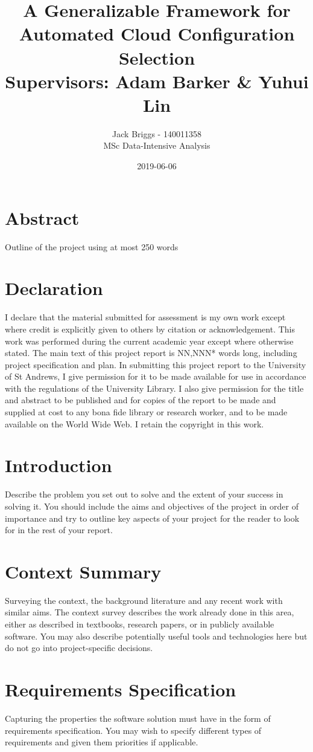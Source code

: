 \documentclass{article}
\title{\vspace{-2.0cm} A Generalizable Framework for Automated Cloud Configuration Selection \\ \vspace{0.5cm} \large Supervisors: Adam Barker \& Yuhui Lin}
\date{2019-06-06}
\author{Jack Briggs - 140011358 \\ MSc Data-Intensive Analysis}
\begin{document}
\maketitle
\newpage
\section*{Abstract}
Outline of the project using at most 250 words
\newpage
\section*{Declaration}
I declare that the material submitted for assessment
is my own work except where credit is explicitly
given to others by citation or acknowledgement. This
work was performed during the current academic year
except where otherwise stated.
The main text of this project report is NN,NNN* words
long, including project specification and plan.
In submitting this project report to the University of St
Andrews, I give permission for it to be made
available for use in accordance with the regulations of the University Library. I also give permission for the title and abstract to be published and for copies of the report to be made and supplied at cost to any bona fide library or research worker, and to be made available on the World Wide Web. I retain the copyright in this work.
\newpage
\tableofcontents
\newpage
\section*{Introduction}
Describe the problem you set out to solve and the extent
of your success in solving it. You should include the aims
and objectives of the project in order of importance and
try to outline key aspects of your project for the reader to look for in the rest of your report.
\section*{Context Summary}
Surveying the context, the background literature and any
recent work with similar aims. The context survey
describes the work already done in this area, either as
described in textbooks, research papers, or in publicly
available software. You may also describe potentially
useful tools and technologies here but do not go into
project-specific decisions.
\section*{Requirements Specification}
Capturing the properties the software solution must have
in the form of requirements specification. You may wish
to specify different types of requirements and given them
priorities if applicable.
\end{document}
